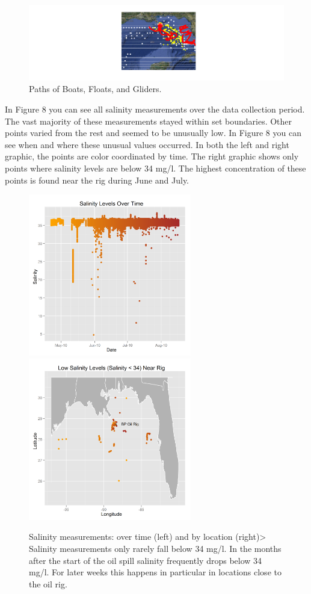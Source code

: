 \documentclass[11pt]{article}
\begin{document}
\begin{figure}[htbp] %
   \centering
   \includegraphics[width=5in]{boats-floats-gliders.png} 
   \caption{Paths of Boats, Floats, and Gliders. }
   \label{Boats, Floats and Gliders}
\end{figure}
In Figure 8 you can see all salinity measurements over the data collection period. The vast majority of these measurements stayed within set boundaries. Other points varied from the rest and seemed to be unusually low. In Figure 8 you can see when and where these unusual values occurred. In both the left and right graphic, the points are color coordinated by time. The right graphic shows only points where salinity levels are below 34 mg/l. The highest concentration of these points is found near the rig during June and July.
\begin{figure}[htbp] %
   \centering
   \includegraphics[width=2.8in]{salinity-time.png} 
   \includegraphics[width=2.8in]{salinity-map.png} 
   \caption{Salinity measurements: over time (left) and by location (right)> Salinity measurements only rarely fall below 34 mg/l. In the months after the start of the oil spill salinity frequently drops below 34 mg/l. For later weeks this happens in particular in locations close to the oil rig.}
   \label{salinity-timeline}
\end{figure}
\end{document}
